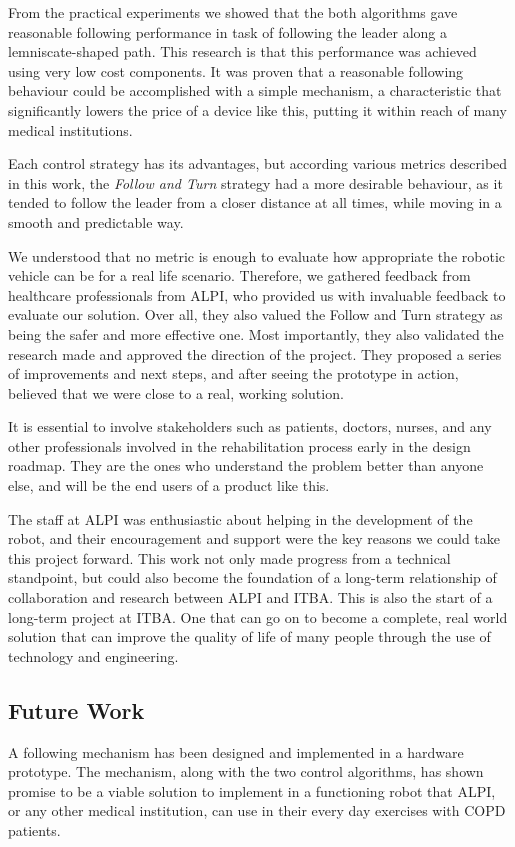 \documentclass[journal]{IEEEtran}
\begin{document}
From the practical experiments we showed that the both algorithms gave reasonable following performance in task of following the leader along a lemniscate-shaped path. This research is that this performance was achieved using very low cost components. It was proven that a reasonable following behaviour could be accomplished with a simple mechanism, a characteristic that significantly lowers the price of a device like this, putting it within reach of many medical institutions.


Each control strategy has its advantages, but according various metrics described in this work, the \textit{Follow and Turn} strategy had a more desirable behaviour, as it tended to follow the leader from a closer distance at all times, while moving in a smooth and predictable way. 

We understood that no metric is enough to evaluate how appropriate the robotic vehicle can be for a real life scenario. Therefore, we gathered feedback from healthcare professionals from ALPI, who provided us with invaluable feedback to evaluate our solution. Over all, they also valued the Follow and Turn strategy as being the safer and more effective one. Most importantly, they also validated the research made and approved the direction of the project. They proposed a series of improvements and next steps, and after seeing the prototype in action, believed that we were close to a real, working solution. 

It is essential to involve stakeholders such as patients, doctors, nurses, and any other professionals involved in the rehabilitation process early in the design roadmap. They are the ones who understand the problem better than anyone else, and will be the end users of a product like this. 

The staff at ALPI was enthusiastic about helping in the development of the robot, and their encouragement and support were the key reasons we could take this project forward. This work not only made progress from a technical standpoint, but could also become the foundation of a long-term relationship of collaboration and research between ALPI and ITBA. This is also the start of a long-term project at ITBA. One that can go on to become a complete, real world solution that can improve the quality of life of many people through the use of technology and engineering. 

\subsection{Future Work}
A following mechanism has been designed and implemented in a hardware prototype. The mechanism, along with the two control algorithms, has shown promise to be a viable solution to implement in a functioning robot that ALPI, or any other medical institution, can use in their every day exercises with COPD patients. 
\end{document}
